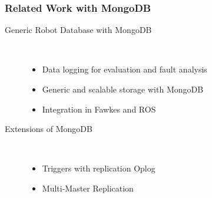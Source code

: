 \begin{frame}
  \frametitle{Related Work with MongoDB}
  \begin{description}
  \item[Generic Robot Database with MongoDB~\cite{RoboDB}]%
                \hfill \\
    \begin{itemize}
    \item Data logging for evaluation and fault analysis
    \item Generic and scalable storage with MongoDB
    \item Integration in Fawkes and ROS
    \end{itemize}
\bigskip
  \item[Extensions of  MongoDB]%
                \hfill \\
    \begin{itemize}
    \item Triggers with replication Oplog~\cite{mongodb-trigger}
    \item Multi-Master Replication~\cite{mongodb-multi-master}
    \end{itemize}
  \end{description}
\end{frame}


